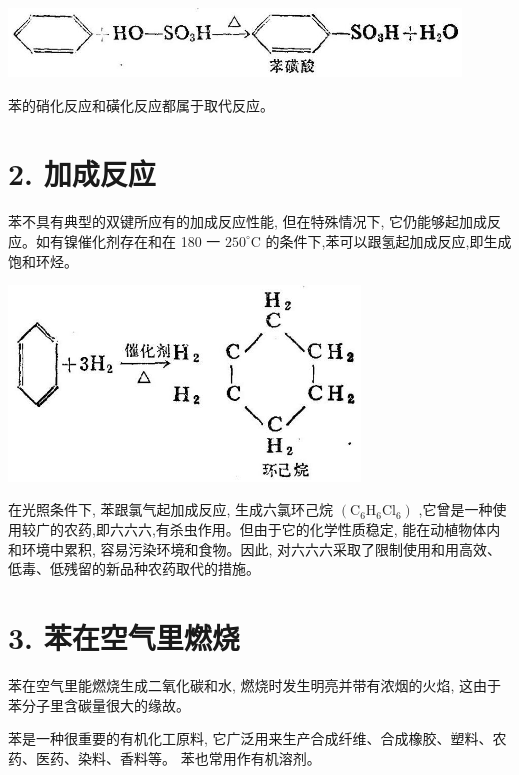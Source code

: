 \documentclass[10pt]{article}
\begin{document}
\begin{center}
\includegraphics[max width=0.9\textwidth]{images/01912d16-be99-77bb-9535-4f3ed8d9946f_88_539690.jpg}
\end{center}

苯的硝化反应和磺化反应都属于取代反应。

\section*{2. 加成反应}

苯不具有典型的双键所应有的加成反应性能, 但在特殊情况下, 它仍能够起加成反应。如有镍催化剂存在和在 180 一 \({250}^{ \circ }\mathrm{C}\) 的条件下,苯可以跟氢起加成反应,即生成饱和环烃。

\begin{center}
\includegraphics[max width=0.7\textwidth]{images/01912d16-be99-77bb-9535-4f3ed8d9946f_88_160542.jpg}
\end{center}

在光照条件下, 苯跟氯气起加成反应, 生成六氯环己烷 \(\left( {{\mathrm{C}}_{6}{\mathrm{H}}_{6}{\mathrm{{Cl}}}_{6}}\right)\) ,它曾是一种使用较广的农药,即六六六,有杀虫作用。但由于它的化学性质稳定, 能在动植物体内和环境中累积, 容易污染环境和食物。因此, 对六六六采取了限制使用和用高效、低毒、低残留的新品种农药取代的措施。

\section*{3. 苯在空气里燃烧}

苯在空气里能燃烧生成二氧化碳和水, 燃烧时发生明亮并带有浓烟的火焰, 这由于苯分子里含碳量很大的缘故。

苯是一种很重要的有机化工原料, 它广泛用来生产合成纤维、合成橡胶、塑料、农药、医药、染料、香料等。 苯也常用作有机溶剂。
\end{document}
